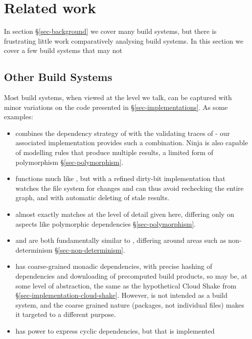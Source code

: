 \clearpage
\section{Related work}\label{sec-related}

In section \S\ref{sec-background} we cover many build systems, but there is frustrating little work comparatively analysing build systems. In this section we cover a few build systems that may not

\subsection{Other Build Systems}\label{sec-related-build}

Most build systems, when viewed at the level we talk, can be captured with minor variations on the code presented in \S\ref{sec-implementations}. As some examples:

\begin{itemize}
\item \Ninja \cite{ninja} combines the dependency strategy of \Make with the validating traces of \Shake - our associated implementation provides such a combination. Ninja is also capable of modelling rules that produce multiple results, a limited form of polymorphism \S\ref{sec-polymorphism}.
\item \Tup \cite{tup} functions much like \Make, but with a refined dirty-bit implementation that watches the file system for changes and can thus avoid rechecking the entire graph, and with automatic deleting of stale results.
\item \Redo \cite{redo} almost exactly matches \Shake at the level of detail given here, differing only on aspects like polymorphic dependencies \S\ref{sec-polymorphism}.
\item \Buck \cite{buck} and \CloudBuild \cite{cloudbuild} are both fundamentally similar to \Bazel, differing around areas such as non-determinism \S\ref{sec-non-determinism}.
\item \Nix \cite{nix} has coarse-grained monadic dependencies, with precise hashing of dependencies and downloading of precomputed build products, so may be, at some level of abstraction, the same as the hypothetical Cloud Shake from \S\ref{sec-implementation-cloud-shake}. However, \Nix is not intended as a build system, and the coarse grained nature (packages, not individual files) makes it targeted to a different purpose. 
\item \Pluto \cite{pluto} has power to express cyclic dependencies, but that is implemented 
\end{itemize}


